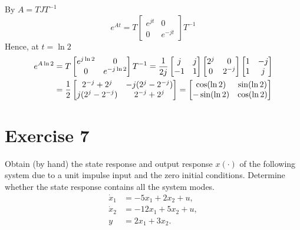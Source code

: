 \documentclass[12pt,a4paper]{article}
\begin{document}
By $A = TJT^{-1}$
\[
e^{At} = T \begin{bmatrix}
	e^{jt} & 0 \\ 0 & e^{-jt} 
\end{bmatrix} T^{-1}
\]
Hence, at $ t = \ln 2$ 
\begin{align*}
	e^{A\ln2} &= T\begin{bmatrix}
		e^{j\ln2} & 0 \\ 0 & e^{-j\ln2}
	\end{bmatrix}T^{-1} = {1\over 2j}\begin{bmatrix}
		j & j \\ -1 & 1
	\end{bmatrix}\begin{bmatrix}
		2^j & 0 \\ 0 & 2^{-j}
	\end{bmatrix} \begin{bmatrix}
		1 & -j \\ 1 & j
	\end{bmatrix} \\&= {1\over2}\begin{bmatrix}
		2^{-j} + 2^j & -j(2^j - 2^{-j}) \\
		j(2^j - 2^{-j}) &2^{-j} + 2^j
	\end{bmatrix} = \begin{bmatrix}
		\cos(\ln2) & \sin(\ln2) \\ -\sin(\ln2) & \cos(\ln2)
	\end{bmatrix}
\end{align*}

\vspace{3cm}

\needspace{11cm}
\section*{Exercise 7}
Obtain (by hand) the state response and output response $x(\cdot)$ of the following system due to a unit impulse input and the zero initial conditions. Determine whether the state response contains all the system modes.
\begin{align*}
\dot{x}_1&=-5x_1+2x_2+u,\\
\dot{x}_2&=-12x_1+5x_2+u,\\
y&=2x_1+3x_2.
\end{align*}
\end{document}
